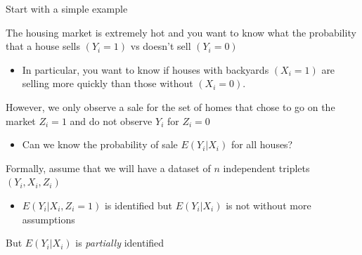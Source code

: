 \documentclass[notes,11pt, aspectratio=169]{beamer}
\newenvironment{wideitemize}{\itemize\addtolength{\itemsep}{10pt}}{\enditemize}
\begin{document}
\begin{frame}{Start with a simple example}
  \begin{wideitemize}
  \item The housing market is extremely hot and you want to know what
    the probability that a house sells $(Y_{i} = 1)$ vs doesn't sell $(Y_{i} = 0)$
    \begin{itemize}
  \item In particular, you want to know if houses with backyards
    $(X_{i} = 1)$ are selling more quickly than those without
    $(X_{i} = 0)$.
  \end{itemize}
\item However, we only observe a sale for the set of homes that chose
  to go on the market $Z_{i} = 1$ and do not observe $Y_{i}$ for
  $Z_{i} = 0$
  \begin{itemize}
  \item Can we know the probability of sale $E(Y_{i} | X_{i})$ for all houses? 
  \end{itemize}
\item Formally, assume that we will have a dataset of $n$ independent
  triplets $(Y_{i}, X_{i}, Z_{i})$
  \begin{itemize}
  \item $E(Y_{i} | X_{i}, Z_{i} = 1)$ is identified but
    $E(Y_{i} | X_{i})$ is not without more assumptions
  \end{itemize}
\item But $E(Y_{i} | X_{i})$ is \emph{partially} identified
  \end{wideitemize}
\end{frame}
\end{document}
